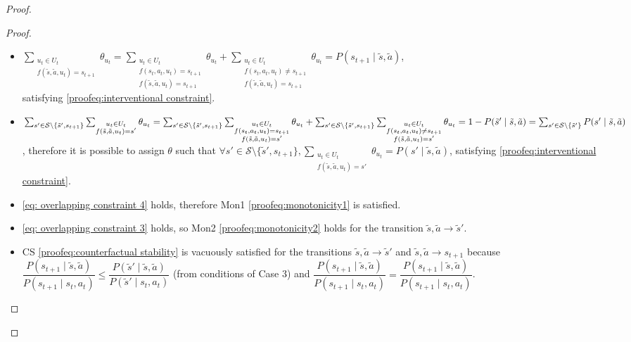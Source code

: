 \begin{proof}
\begin{proof}
\begin{itemize}
    \item $\sum_{\substack{u_t \in U_t \\f(\tilde{s}, \tilde{a}, u_t) = s_{t+1}}} \theta_{u_t} = \sum_{\substack{u_t \in U_t \\f(s_t, a_t, u_t) = s_{t+1} \\ f(\tilde{s}, \tilde{a}, u_t) = s_{t+1}}} \theta_{u_t} + \sum_{\substack{u_t \in U_t \\f(s_t, a_t, u_t) \neq s_{t+1} \\ f(\tilde{s}, \tilde{a}, u_t) = s_{t+1}}} \theta_{u_t} = P(s_{t+1} \mid \tilde{s}, \tilde{a})$, \\satisfying \eqref{proofeq:interventional constraint}.

    \item $\sum_{s' \in \mathcal{S}\setminus\{\tilde{s}', s_{t+1}\}}\sum_{\substack{u_t \in U_t \\f(\tilde{s}, \tilde{a}, u_t) = s'}} \theta_{u_t} = \sum_{s' \in \mathcal{S}\setminus\{\tilde{s}', s_{t+1}\}}\sum_{\substack{u_t \in U_t \\f(s_t, a_t, u_t) = s_{t+1} \\ f(\tilde{s}, \tilde{a}, u_t) = s'}} \theta_{u_t} + \sum_{s' \in \mathcal{S}\setminus\{\tilde{s}', s_{t+1}\}}\sum_{\substack{u_t \in U_t \\f(s_t, a_t, u_t) \neq s_{t+1} \\ f(\tilde{s}, \tilde{a}, u_t) = s'}} \theta_{u_t} \\= 1 - P(\tilde{s}' \mid \tilde{s}, \tilde{a}) = \sum_{s' \in \mathcal{S}\setminus\{\tilde{s}'\}}P(s' \mid \tilde{s}, \tilde{a})$, therefore it is possible to assign $\theta$ such that $\forall s' \in \mathcal{S}\setminus\{\tilde{s}', s_{t+1}\}, \sum_{\substack{u_t \in U_t \\ f(\tilde{s}, \tilde{a}, u_t) = s'}}{\theta_{u_t}} = P(s' \mid \tilde{s}, \tilde{a})$, satisfying \eqref{proofeq:interventional constraint}.

    \item \eqref{eq: overlapping constraint 4} holds, therefore Mon1 \eqref{proofeq:monotonicity1} is satisfied.
    
    \item \eqref{eq: overlapping constraint 3} holds, so Mon2 \eqref{proofeq:monotonicity2} holds for the transition $\tilde{s}, \tilde{a} \rightarrow \tilde{s}'$.

    \item CS \eqref{proofeq:counterfactual stability} is vacuously satisfied for the transitions $\tilde{s}, \tilde{a} \rightarrow \tilde{s}'$ and $\tilde{s}, \tilde{a} \rightarrow s_{t+1}$ because $\dfrac{P(s_{t+1} \mid \tilde{s}, \tilde{a})}{P(s_{t+1} \mid s_t, a_t)}\leq\dfrac{P(\tilde{s}' \mid \tilde{s}, \tilde{a})}{P(\tilde{s}' \mid s_t, a_t)}$ (from conditions of Case 3) and $\dfrac{P(s_{t+1} \mid \tilde{s}, \tilde{a})}{P(s_{t+1} \mid s_t, a_t)} = \dfrac{P(s_{t+1} \mid \tilde{s}, \tilde{a})}{P(s_{t+1} \mid s_t, a_t)}$.


\end{itemize}
\end{proof}
\end{proof}
